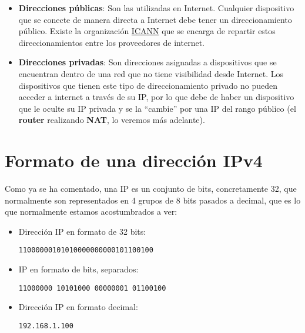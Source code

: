 \begin{itemize}
    \item \textbf{Direcciones públicas}: Son las utilizadas en Internet. Cualquier dispositivo que se conecte de manera directa a Internet debe tener un direccionamiento público. Existe la organización \href{https://es.wikipedia.org/wiki/Corporaci%C3%B3n_de_Internet_para_la_Asignaci%C3%B3n_de_Nombres_y_N%C3%BAmeros}{ICANN} que se encarga de repartir estos direccionamientos entre los proveedores de internet.

    \item \textbf{Direcciones privadas}: Son direcciones asignadas a dispositivos que se encuentran dentro de una red que no tiene visibilidad desde Internet. Los dispositivos que tienen este tipo de direccionamiento privado no pueden acceder a internet a través de su IP, por lo que debe de haber un dispositivo que le oculte su IP privada y se la “cambie” por una IP del rango público (el \textbf{router} realizando \textbf{NAT}, lo veremos más adelante).
\end{itemize}

\section{Formato de una dirección IPv4}

Como ya se ha comentado, una IP es un conjunto de bits, concretamente 32, que normalmente son representados en 4 grupos de 8 bits pasados a decimal, que es lo que normalmente estamos acostumbrados a ver:

\begin{itemize}
    \item Dirección IP en formato de 32 bits:
    \begin{center}
        \texttt{11000000101010000000000101100100}
    \end{center}
    \item IP en formato de bits, separados:
    \begin{center}
        \texttt{11000000  10101000  00000001  01100100}
    \end{center}
    \item Dirección IP en formato decimal:
    \begin{center}
        \texttt{192\space\space\space\space\space\space .168\space\space\space\space\space\space\space.1\space\space\space\space\space\space\space .100}
    \end{center}
\end{itemize}

